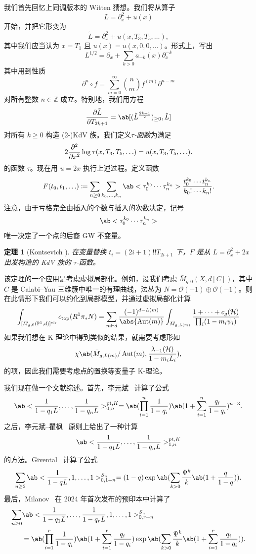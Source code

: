 \documentclass{amsart}
\newtheorem{thm}{定理}[section]
\theoremstyle{definition}
\theoremstyle{remark}
\theoremstyle{plain}
\theoremstyle{definition}
\theoremstyle{remark}
\newcommand{\Z}{\mathbb{Z}}
\renewcommand{\P}{\mathbb{P}}
\newcommand{\mc}[1]{\mathcal{#1}}
\newcommand{\mr}[1]{\mathrm{#1}}
\newcommand{\1}{\mathbf{1}}
\newcommand{\2}{\mathbf{2}}
\newcommand{\3}{\mathbf{3}}
\newcommand{\vir}{\mr{vir}}
\DeclareMathOperator{\Aut}{Aut}
\begin{document}
我们首先回忆上同调版本的 Witten 猜想。我们将从算子
\[ L = \partial_x^2 + u(x) \]
开始，并把它形变为
\[ \tilde{L} = \partial_x^2 + u(x, T_3, T_5, \ldots), \]
其中我们应当认为 \(x = T_1\) 且 \(u(x) = u(x, 0, 0,\ldots)\)。形式上，写出
\[ L^{1/2} = \partial_x + \sum_{k > 0} a_{-k}(x) \partial_x^{-k} \]
其中用到性质
\[ \partial^n \circ f = \sum_{m = 0}^{\infty} \binom{n}{m} f^{(m)} \partial^{n-m} \]
对所有整数 \(n \in \Z\) 成立。特别地，我们用方程
\[ \pdv{\tilde{L}}{T_{2k+1}} = \ab[(\tilde{L}^{\frac{2k+1}{2}})_{\geq 0}, \tilde{L}] \]
对所有 \(k \geq 0\) 构造 (2-)KdV 族。我们定义\textit{\(\tau\)-函数}为满足
\[ 2 \pdv[2]{}{x}\log \tau(x, T_3, T_5, \ldots) = u(x, T_3, T_5, \ldots). \]
的函数 \(\tau\)。现在用 \(u = 2x\) 执行上述过程。定义函数
\[ F(t_0, t_1, \ldots) \coloneqq \sum_{n \geq 0} \sum_{k_0, \ldots, k_n} \ab<\tau_0^{k_0} \cdots \tau_n^{k_n}> \frac{t_0^{k_0} \cdots t_n^{k_n}}{k_0! \cdots k_n!}. \]
注意，由于亏格完全由插入的个数与插入的次数决定，记号
\[ \ab<\tau_0^{k_0} \cdots \tau_n^{k_n}> \]
唯一决定了一个点的后裔 GW 不变量。

\begin{thm}[Kontsevich {\cite{Kontsevich1992}}]
    在变量替换 \(t_i = (2i+1)!! T_{2i+1}\) 下，\(F\) 是从 \(L = \partial_x^2 + 2x\) 出发构造的 KdV 族的 \(\tau\)-函数。
\end{thm}

该定理的一个应用是考虑虚拟局部化。例如，设我们考虑 \(\bar{M}_{g,0}(X, d[C])\)，其中 \(C\) 是 Calabi–Yau 三维簇中唯一的有理曲线，法丛为 \(N = \mc{O}(-1)\oplus \mc{O}(-1)\)。则在此情形下我们可以约化到局部模型，并通过虚拟局部化计算
\begin{align*}
    \int_{[\bar{M}_{g,0}(\P^1, d)]^{\vir}} c_{\mr{top}}(R^1 \pi_* N) = \sum_{m \vdash d} \frac{(-1)^{d-L(m)}}{\abs{\Aut(m)}} \int_{\bar{M}_{g, L(m)}} \frac{1 + \cdots + c_g(\mc{H})}{\prod_i (1-m_i \psi_i)}
\end{align*}
如果我们想在 K-理论中得到类似的结果，就需要考虑形如
\[ \chi\ab(\bar{M}_{g, L(m)}/\Aut(m), \frac{\lambda_{-1}(\mc{H})}{1-m_i L_i}), \]
的项，因此我们需要考虑点的置换等变量子 K-理论。

我们现在做一个文献综述。首先，李元斌~\cite{Lee1997} 计算了公式
\[ \ab<\frac{1}{1-q_1 L}, \ldots, \frac{1}{1-q_n L}>_{0,n}^{\mr{pt}, K} = \ab(\prod_{i=1}^n \frac{1}{1-q_i}) \ab(1 + \sum_{i=1}^n \frac{q_i}{1-q_i})^{n-3}. \]
之后，李元斌–瞿枫~\cite{LeeQu2014} 原则上给出了一种计算
\[ \ab<\frac{1}{1-q_1 L}, \ldots, \frac{1}{1-q_n L}>_{1,n}^{\mr{pt}, K} \]
的方法。Givental~\cite{Givental2017K1} 计算了公式
\[ \sum_{n \geq 2} \ab<\frac{1}{1-q L}, 1, \ldots, 1>_{0,1+n}^{S_n} = (1-q) \exp\ab(\sum_{k > 0} \frac{\Psi^k}{k} \ab(1 + \frac{q}{1-q})). \]
最后，Milanov~\cite{Milanov2025} 在 2024 年首次发布的预印本中计算了
\begin{align*}
    \sum_{n \geq 0}& \ab<\frac{1}{1-q_1 L}, \ldots, \frac{1}{1-q_r L}, 1, \ldots, 1>_{0,r+n}^{S_n} \\
    &= \ab(\prod_{i=1}^{r} \frac{1}{1-q_i})\ab(1 + \sum_{i=1}^r \frac{q_i}{1-q_i}) \exp\ab(\sum_{k > 0} \frac{\Psi^k}{k} \ab(1 + \sum_{i=1}^r \frac{q_i}{1-q_i})). 
\end{align*}
\end{document}
